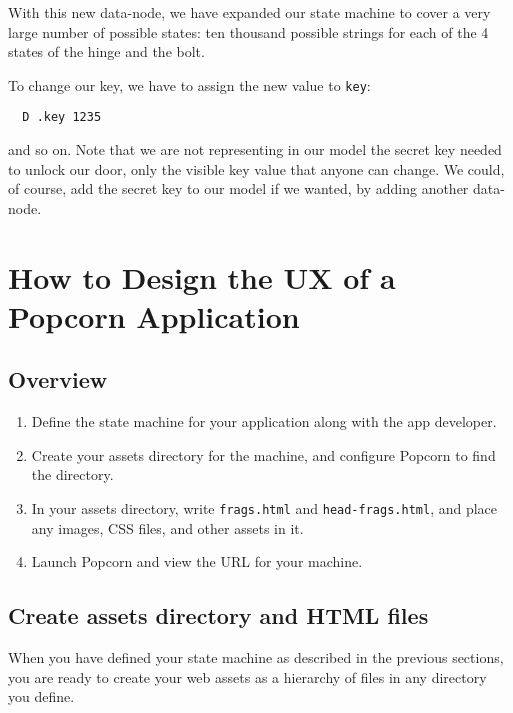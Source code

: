 \documentclass[12pt]{article}
\begin{document}
With this new data-node, we have expanded our state machine to cover a
very large number of possible states: ten thousand possible strings
for each of the 4 states of the hinge and the bolt.

To change our key, we have to assign the new value to \verb`key`:

\begin{verbatim}
  D .key 1235
\end{verbatim}

and so on. Note that we are not representing in our model the secret
key needed to unlock our door, only the visible key value that anyone
can change. We could, of course, add the secret key to our model if we
wanted, by adding another data-node.

\section{How to Design the UX of a Popcorn Application}

\subsection{Overview}

\begin{enumerate}
  
\item Define the state machine for your application along with the app
developer.

\item Create your assets directory for the machine, and configure Popcorn
to find the directory.

\item In your assets directory, write \verb`frags.html` and \verb`head-frags.html`,
and place any images, CSS files, and other assets in it.

\item Launch Popcorn and view the URL for your machine.

\end{enumerate}

\subsection{Create assets directory and HTML files}

When you have defined your state machine as described in the previous
sections, you are ready to create your web assets as a hierarchy of
files in any directory you define.
\end{document}
